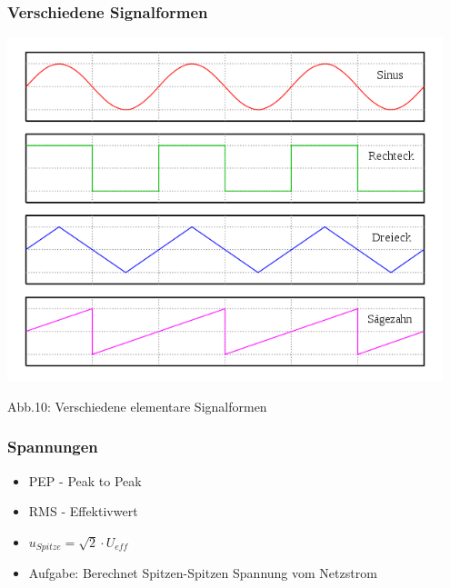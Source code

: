 \begin{frame}
	\frametitle{Verschiedene Signalformen}
	\begin{center}
        \includegraphics[width=0.95\textwidth]{a16/Signalformen.png}\\
		\begin{small}
			Abb.10: Verschiedene elementare Signalformen \cite{wmen}
		\end{small}		       
	\end{center}
\end{frame}

\begin{frame}
    \frametitle{Spannungen}
    \begin{center}
    \begin{itemize}
			\item PEP - Peak to Peak
			\item RMS - Effektivwert
			\item $u_{Spitze} = \sqrt{2} \cdot U_{eff}$ \\
			\item Aufgabe: Berechnet Spitzen-Spitzen Spannung vom Netzstrom 
    \end{itemize}
	\end{center}
\end{frame}

